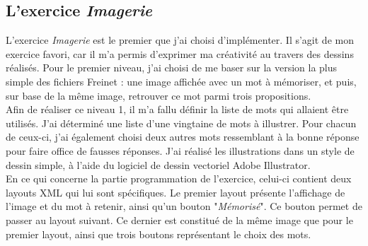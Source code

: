 


\subsection{L'exercice \textit{Imagerie}}
L'exercice \textit{Imagerie} est le premier que j'ai choisi d'implémenter. Il s'agit de mon exercice favori, car il m'a permis d'exprimer ma créativité au travers des dessins réalisés. Pour le premier niveau, j'ai choisi de me baser sur la version la plus simple des fichiers Freinet : une image affichée avec un mot à mémoriser, et puis, sur base de la même image, retrouver ce mot parmi trois propositions.\\

Afin de réaliser ce niveau 1, il m'a fallu définir la liste de mots qui allaient être utilisés. J'ai déterminé une liste d'une vingtaine de mots à illustrer. Pour chacun de ceux-ci, j'ai également choisi deux autres mots ressemblant à la bonne réponse pour faire office de fausses réponses. J'ai réalisé les illustrations dans un style de dessin simple, à l'aide du logiciel de dessin vectoriel Adobe Illustrator. \\


En ce qui concerne la partie programmation de l'exercice, celui-ci contient deux layouts XML qui lui sont spécifiques. Le premier layout présente l'affichage de l'image et du mot à retenir, ainsi qu'un bouton "\textit{Mémorisé}". Ce bouton permet de passer au layout suivant. Ce dernier est constitué de la même image que pour le premier layout, ainsi que trois boutons représentant le choix des mots.\\

